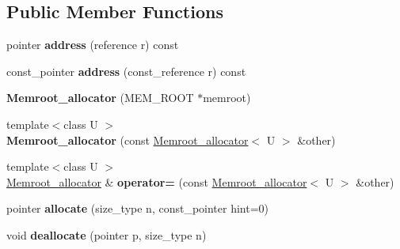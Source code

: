 \subsection*{Public Member Functions}
\begin{DoxyCompactItemize}
\item 
\mbox{\label{classMemroot__allocator_a60638ab69908b589fc0faff391c26330}} 
pointer {\bfseries address} (reference r) const
\item 
\mbox{\label{classMemroot__allocator_a7c8f4cba39536462f9cf0cb2db2ca45d}} 
const\+\_\+pointer {\bfseries address} (const\+\_\+reference r) const
\item 
\mbox{\label{classMemroot__allocator_a987fee394011a0e8c30b63f5b83a5a58}} 
{\bfseries Memroot\+\_\+allocator} (M\+E\+M\+\_\+\+R\+O\+OT $\ast$memroot)
\item 
\mbox{\label{classMemroot__allocator_a514cbd92f6252180b2dad1ef5fecafba}} 
{\footnotesize template$<$class U $>$ }\\{\bfseries Memroot\+\_\+allocator} (const \mbox{\hyperlink{classMemroot__allocator}{Memroot\+\_\+allocator}}$<$ U $>$ \&other)
\item 
\mbox{\label{classMemroot__allocator_a8d95debb2a3b48f6b4df93ad1d450825}} 
{\footnotesize template$<$class U $>$ }\\\mbox{\hyperlink{classMemroot__allocator}{Memroot\+\_\+allocator}} \& {\bfseries operator=} (const \mbox{\hyperlink{classMemroot__allocator}{Memroot\+\_\+allocator}}$<$ U $>$ \&other)
\item 
\mbox{\label{classMemroot__allocator_ac18777cac3334b1bc43db3ff9b158d4b}} 
pointer {\bfseries allocate} (size\+\_\+type n, const\+\_\+pointer hint=0)
\item 
\mbox{\label{classMemroot__allocator_aaa344de7f922ee5ce4a1ea839931f362}} 
void {\bfseries deallocate} (pointer p, size\+\_\+type n)
\item 
\mbox{\label{classMemroot__allocator_a708600eff11e8d38b3386e12abdc5ba0}} 

\end{DoxyCompactItemize}
